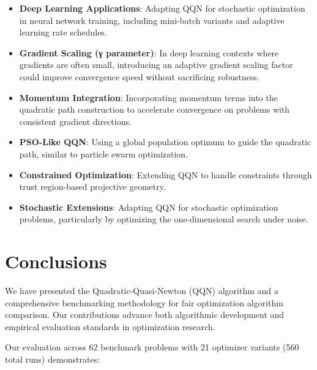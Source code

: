 \begin{itemize}
\tightlist
\item
  \textbf{Deep Learning Applications}: Adapting QQN for stochastic optimization in neural network training, including mini-batch variants and adaptive learning rate schedules.
\item
  \textbf{Gradient Scaling (γ parameter)}: In deep learning contexts where gradients are often small, introducing an adaptive gradient scaling factor could improve convergence speed without sacrificing robustness.
\item
  \textbf{Momentum Integration}: Incorporating momentum terms into the quadratic path construction to accelerate convergence on problems with consistent gradient directions.
\item
  \textbf{PSO-Like QQN}: Using a global population optimum to guide the quadratic path, similar to particle swarm optimization.
\item
  \textbf{Constrained Optimization}: Extending QQN to handle constraints through trust region-based projective geometry.
\item
  \textbf{Stochastic Extensions}: Adapting QQN for stochastic optimization problems, particularly by optimizing the one-dimensional search under noise.
\end{itemize}

\hypertarget{conclusions}{%
\section{Conclusions}\label{conclusions}}

We have presented the Quadratic-Quasi-Newton (QQN) algorithm and a comprehensive benchmarking methodology for fair optimization algorithm comparison. Our contributions advance both algorithmic development and empirical evaluation standards in optimization research.

Our evaluation across 62 benchmark problems with 21 optimizer variants (560 total runs) demonstrates:


